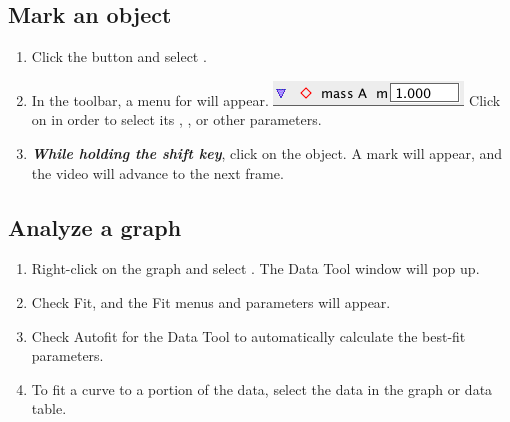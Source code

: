 \subsection*{Mark an object}

\begin{enumerate}
	\item Click the  button and select .
	\item In the toolbar, a menu for  will appear.  \includegraphics[scale=0.5]{./appendix-tracker/massA} Click on  in order to select its , , or other parameters.
	\item {\bf \emph{While holding the shift key}}, click on the object. A mark will appear, and the video will advance to the next frame.
\end{enumerate}

\subsection*{Analyze a graph}

\begin{enumerate}
	\item Right-click on the graph and select . The Data Tool window will pop up. 
	\item Check Fit, and the Fit menus and parameters will appear. 
	\item Check Autofit for the Data Tool to automatically calculate the best-fit parameters.
	\item To fit a curve to a portion of the data, select the data in the graph or data table.
\end{enumerate}
